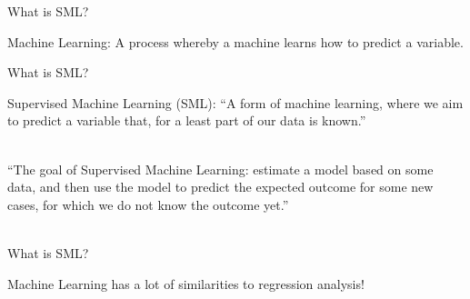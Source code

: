\documentclass[handout]{beamer}
\begin{document}
	\begin{frame}{What is SML?} 
		
		Machine Learning: A process whereby a machine learns how to predict a variable.
		
		
	\end{frame}
	
	
	\begin{frame}{What is SML?} 
		
		Supervised Machine Learning (SML): “A form of machine learning, where we aim to predict a variable that, for a least part of our data is known.” \\\
		
		“The goal of Supervised Machine Learning: estimate a model based on some data, and then use the model to predict the expected outcome for some new cases, for which we do not know the outcome yet.” \\\
		
		\begin{tiny}
		\end{tiny}
		
		
		
		
		
	\end{frame}
	
	\begin{frame}{What is SML?} 
		
		Machine Learning has a lot of similarities to regression analysis!
		
		
	\end{frame}
	
\end{document}
